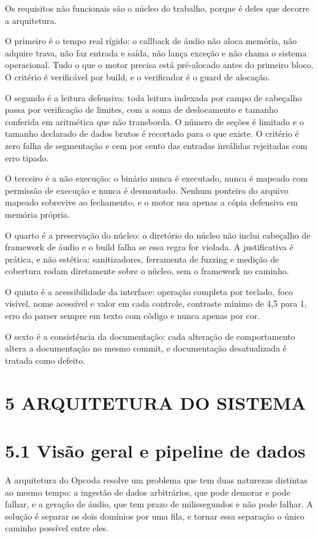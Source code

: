 \documentclass[12pt,a4paper]{article}
\begin{document}
Os requisitos não funcionais são o núcleo do trabalho, porque é deles que decorre a arquitetura.


O primeiro é o tempo real rígido: o callback de áudio não aloca memória, não adquire trava, não faz entrada e saída, não lança exceção e não chama o sistema operacional. Tudo o que o motor precisa está pré-alocado antes do primeiro bloco. O critério é verificável por build, e o verificador é o guard de alocação.


O segundo é a leitura defensiva: toda leitura indexada por campo de cabeçalho passa por verificação de limites, com a soma de deslocamento e tamanho conferida em aritmética que não transborda. O número de seções é limitado e o tamanho declarado de dados brutos é recortado para o que existe. O critério é zero falha de segmentação e cem por cento das entradas inválidas rejeitadas com erro tipado.


O terceiro é a não execução: o binário nunca é executado, nunca é mapeado com permissão de execução e nunca é desmontado. Nenhum ponteiro do arquivo mapeado sobrevive ao fechamento, e o motor usa apenas a cópia defensiva em memória própria.


O quarto é a preservação do núcleo: o diretório do núcleo não inclui cabeçalho de framework de áudio e o build falha se essa regra for violada. A justificativa é prática, e não estética: sanitizadores, ferramenta de fuzzing e medição de cobertura rodam diretamente sobre o núcleo, sem o framework no caminho.


O quinto é a acessibilidade da interface: operação completa por teclado, foco visível, nome acessível e valor em cada controle, contraste mínimo de 4,5 para 1, erro do parser sempre em texto com código e nunca apenas por cor.


O sexto é a consistência da documentação: cada alteração de comportamento altera a documentação no mesmo commit, e documentação desatualizada é tratada como defeito.


\section*{5 ARQUITETURA DO SISTEMA}

\section*{5.1 Visão geral e pipeline de dados}

A arquitetura do Opcoda resolve um problema que tem duas naturezas distintas ao mesmo tempo: a ingestão de dados arbitrários, que pode demorar e pode falhar, e a geração de áudio, que tem prazo de milissegundos e não pode falhar. A solução é separar os dois domínios por uma fila, e tornar essa separação o único caminho possível entre eles.
\end{document}
